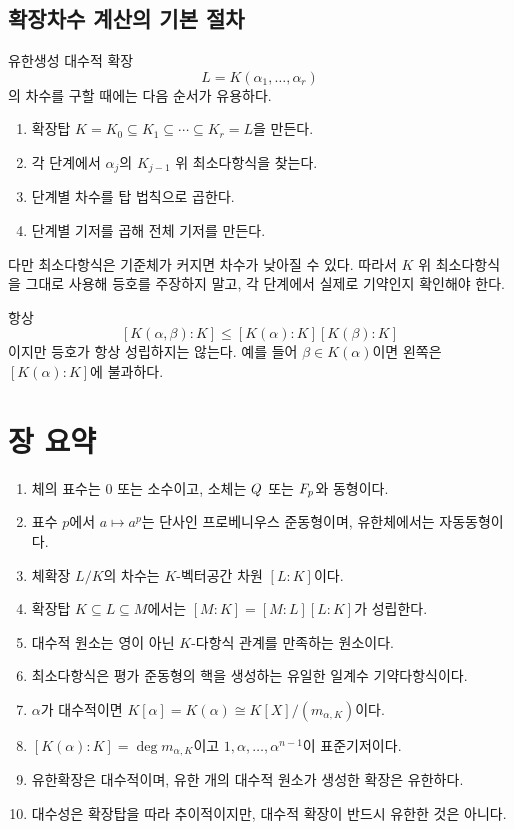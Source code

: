 \subsection{확장차수 계산의 기본 절차}

유한생성 대수적 확장
\[
  L=K(\alpha_1,\dots,\alpha_r)
\]
의 차수를 구할 때에는 다음 순서가 유용하다.

\begin{enumerate}
  \item 확장탑 $K=K_0\subseteq K_1\subseteq\cdots\subseteq K_r=L$을 만든다.
  \item 각 단계에서 $\alpha_j$의 $K_{j-1}$ 위 최소다항식을 찾는다.
  \item 단계별 차수를 탑 법칙으로 곱한다.
  \item 단계별 기저를 곱해 전체 기저를 만든다.
\end{enumerate}

다만 최소다항식은 기준체가 커지면 차수가 낮아질 수 있다. 따라서 $K$ 위 최소다항식을 그대로 사용해 등호를 주장하지 말고, 각 단계에서 실제로 기약인지 확인해야 한다.

\begin{pitfall}
항상
\[
  [K(\alpha,\beta):K]
  \le [K(\alpha):K][K(\beta):K]
\]
이지만 등호가 항상 성립하지는 않는다. 예를 들어 $\beta\in K(\alpha)$이면 왼쪽은 $[K(\alpha):K]$에 불과하다.
\end{pitfall}

\section{장 요약}

\begin{chapterreview}
\begin{enumerate}
  \item 체의 표수는 $0$ 또는 소수이고, 소체는 $Q$ 또는 $F_p$와 동형이다.
  \item 표수 $p$에서 $a\mapsto a^p$는 단사인 프로베니우스 준동형이며, 유한체에서는 자동동형이다.
  \item 체확장 $L/K$의 차수는 $K$-벡터공간 차원 $[L:K]$이다.
  \item 확장탑 $K\subseteq L\subseteq M$에서는 $[M:K]=[M:L][L:K]$가 성립한다.
  \item 대수적 원소는 영이 아닌 $K$-다항식 관계를 만족하는 원소이다.
  \item 최소다항식은 평가 준동형의 핵을 생성하는 유일한 일계수 기약다항식이다.
  \item $\alpha$가 대수적이면 $K[\alpha]=K(\alpha)\cong K[X]/(m_{\alpha,K})$이다.
  \item $[K(\alpha):K]=\deg m_{\alpha,K}$이고 $1,\alpha,\dots,\alpha^{n-1}$이 표준기저이다.
  \item 유한확장은 대수적이며, 유한 개의 대수적 원소가 생성한 확장은 유한하다.
  \item 대수성은 확장탑을 따라 추이적이지만, 대수적 확장이 반드시 유한한 것은 아니다.
\end{enumerate}
\end{chapterreview}

